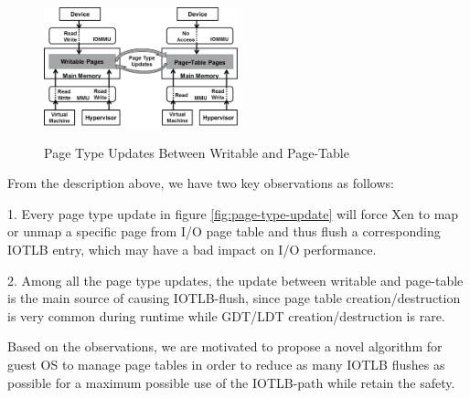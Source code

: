 \begin{figure}[ht]
\centering
\includegraphics[width=0.5\textwidth]{image/background/wr2pt.png} \\
\caption{Page Type Updates Between Writable and Page-Table}
\label{fig:wr2pt}
\end{figure}

From the description above, we have two key observations as follows:

1. Every page type update in figure \ref{fig:page-type-update} will force Xen to map or unmap a specific page from I/O page table and thus flush a corresponding IOTLB entry, which may have a bad impact on I/O performance.

2. Among all the page type updates, the update between writable and page-table is the main source of causing IOTLB-flush, since page table creation/destruction is very common during runtime while GDT/LDT creation/destruction is rare.

Based on the observations, we are motivated to propose a novel algorithm for guest OS to manage page tables in order to reduce as many IOTLB flushes as possible for a maximum possible use of the IOTLB-path while retain the safety.
